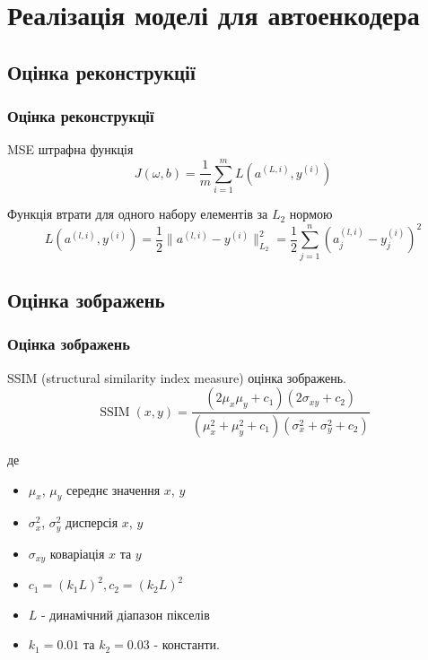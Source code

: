 \documentclass{beamer}
\numberwithin{equation}{section}
\newcounter{e}
\numberwithin{equation}{section}
\numberwithin{figure}{section}
\newcommand{\ith}{^{(i)}}
\begin{document}
	\section{Реалізація моделі для автоенкодера}

	\subsection{Оцінка реконструкції}
	\begin{frame}
		\frametitle{Оцінка реконструкції}
		\begin{block}{MSE штрафна функція}
			\begin{equation}
				\label{eq:cost-function}
				J(\omega, b) =  \frac{1}{m}  \sum_{i=1}^{m} L(a^{(L, i)}, y\ith)
			\end{equation}
		\end{block}
		\begin{block}{Функція втрати для одного набору елементів за $L_2$ нормою}
			\begin{equation}
				\label{eq:loss-function}
				L(a^{(l, i)}, y\ith)  =  \frac{1}{2}  \| a^{(l, i)}  - y\ith \|_{L_2}^{2} = \frac{1}{2} \sum_{j=1}^{n}  (a^{(l, i)}_j -  y\ith_j)^2
			\end{equation}
		\end{block}
	\end{frame}
	
	\subsection{Оцінка зображень}
	\begin{frame}
		\frametitle{Оцінка зображень}
		\begin{block}{SSIM (structural similarity index measure) оцінка зображень.}
			\begin{equation}
				\label{eq:SSIM}
				\operatorname{SSIM}(x, y)=\frac{\left(2 \mu_{x} \mu_{y}+c_{1}\right)\left(2 \sigma_{x 			y}+c_{2}\right)}{\left(\mu_{x}^{2}+\mu_{y}^{2}+c_{1}\right)\left(\sigma_{x}^{2}+\sigma_{y}^{2}+c_{2}\right)}
			\end{equation}
		\end{block}
		де
		\begin{itemize}
			\item $\mu_{x}$, $\mu_{y}$  середнє значення $x$, $y$
			\item $\sigma_{x}^{2}$, $\sigma_{y}^{2}$ дисперсія $x$, $y$
			\item $\sigma_{x y}$ коваріація $x$ та $y$
			\item $c_{1}=\left(k_{1} L\right)^{2}, c_{2}=\left(k_{2} L\right)^{2}$
			\item $L$ - динамічний діапазон пікселів
			\item $k_{1}=0.01$ та $k_{2}=0.03$ - константи.	
		\end{itemize}
	\end{frame}
	
\end{document}

